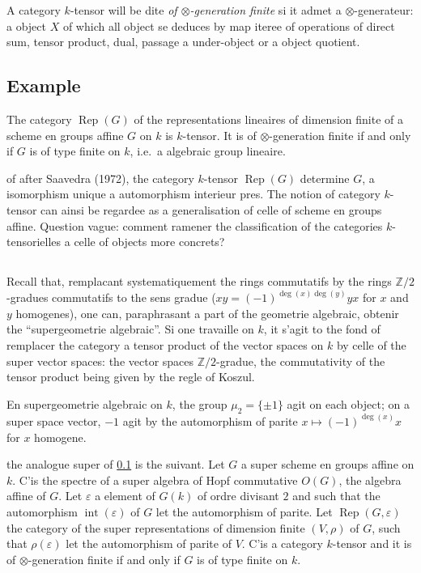 \documentclass[11pt,a4paper]{article}
\theoremstyle{plain}
\theoremstyle{definition}
\newcommand{\Rep}{\operatorname{Rep}}
\begin{document}
A category $k$-tensor will be dite \emph{of $\otimes$-generation finite} si it admet a $\otimes$-generateur: a object $X$ of which all object se deduces by map iteree of operations of direct sum, tensor product, dual, passage a under-object or a object quotient.

\subsection{Example}
\label{0.2}

The category $\Rep(G)$ of the representations lineaires of dimension finite of a scheme en groups affine $G$ on $k$ is $k$-tensor. It is of $\otimes$-generation finite if and only if $G$ is of type finite on $k$, i.e.~a algebraic group lineaire.

of after Saavedra (1972), the category $k$-tensor $\Rep(G)$ determine $G$, a isomorphism unique a automorphism interieur pres. The notion of category $k$-tensor can ainsi be regardee as a generalisation of celle of scheme en groups affine. Question vague: comment ramener the classification of the categories $k$-tensorielles a celle of objects more concrets?

\subsection{}
\label{0.3}

Recall that, remplacant systematiquement the rings commutatifs by the rings $\mathbb{Z}/2$-gradues commutatifs to the sens gradue ($xy=(-1)^{\deg(x)\deg(y)}yx$ for $x$ and $y$ homogenes), one can, paraphrasant a part of the geometrie algebraic, obtenir the ``supergeometrie algebraic''. Si one travaille on $k$, it s'agit to the fond of remplacer the category a tensor product of the vector spaces on $k$ by celle of the super vector spaces: the vector spaces $\mathbb{Z}/2$-gradue, the commutativity of the tensor product being given by the regle of Koszul.

En supergeometrie algebraic on $k$, the group $\mu_2=\{\pm1\}$ agit on each object; on a super space vector, $-1$ agit by the automorphism of parite $x\mapsto(-1)^{\deg(x)}x$ for $x$ homogene.

the analogue super of \ref{0.2} is the suivant. Let $G$ a super scheme en groups affine on $k$. C'is the spectre of a super algebra of Hopf commutative $O(G)$, the algebra affine of $G$. Let $\varepsilon$ a element of $G(k)$ of ordre divisant $2$ and such that the automorphism $\operatorname{int}(\varepsilon)$ of $G$ let the automorphism of parite. Let $\Rep(G,\varepsilon)$ the category of the super representations of dimension finite $(V,\rho)$ of $G$, such that $\rho(\varepsilon)$ let the automorphism of parite of $V$. C'is a category $k$-tensor and it is of $\otimes$-generation finite if and only if $G$ is of type finite on $k$.
\end{document}
